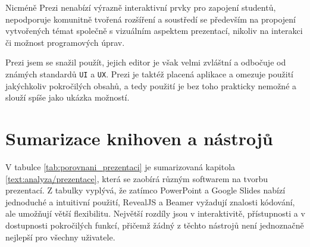 Nicméně Prezi nenabízí výrazně interaktivní prvky pro zapojení studentů, nepodporuje komunitně tvořená rozšíření a soustředí se především na propojení vytvořených témat společně s vizuálním aspektem prezentací, nikoliv na interakci či možnost programových úprav.

Prezi jsem se snažil použít, jejich editor je však velmi zvláštní a odbočuje od známých standardů \texttt{UI} a \texttt{UX}.
Prezi je taktéž placená aplikace a omezuje použití jakýchkoliv pokročilých obsahů, a tedy použití je bez toho prakticky nemožné a slouží spíše jako ukázka možností.

\section{Sumarizace knihoven a nástrojů}

V tabulce \ref{tab:porovnani_prezentaci} je sumarizovaná kapitola \ref{text:analyza/prezentace}, která se zaobírá různým softwarem na tvorbu prezentací.
Z tabulky vyplývá, že zatímco PowerPoint a Google Slides nabízí jednoduché a intuitivní použití, RevealJS a Beamer vyžadují znalosti kódování, ale umožňují větší flexibilitu. Největší rozdíly jsou v interaktivitě, přístupnosti a v dostupnosti pokročilých funkcí, přičemž žádný z těchto nástrojů není jednoznačně nejlepší pro všechny uživatele.


\begin{table}[h!]
    \centering
    \caption{Porovnání aplikací pro tvorbu prezentací}
    \label{tab:porovnani_prezentaci}
\end{table}


